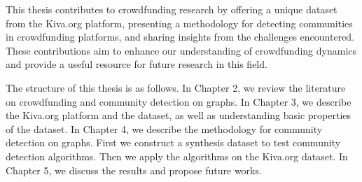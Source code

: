 This thesis contributes to crowdfunding research by offering a unique dataset from the Kiva.org platform,
presenting a methodology for detecting communities in crowdfunding platforms,
and sharing insights from the challenges encountered.
These contributions aim to enhance our understanding of crowdfunding dynamics
and provide a useful resource for future research in this field.

The structure of this thesis is as follows.
In Chapter 2, we review the literature on crowdfunding and community detection on graphs.
In Chapter 3, we describe the Kiva.org platform and the dataset,
as well as understanding basic properties of the dataset.
In Chapter 4, we describe the methodology for community detection on graphs.
First we construct a synthesis dataset to test community detection algorithms.
Then we apply the algorithms on the Kiva.org dataset.
In Chapter 5, we discuss the results and propose future works.
